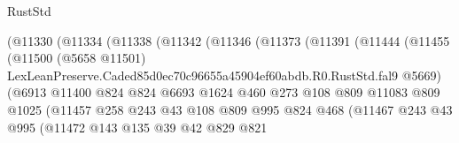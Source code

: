 \begin{lexlean}{RustStd}
\begin{coremodule}
                              (@11330
                                (@11334
                                  (@11338
                                    (@11342
                                      (@11346
                                        (@11373
                                          (@11391
                                            (@11444
                                              (@11455
                                                (@11500
                                                  (@5658 @11501)
                                                  LexLeanPreserve.Caded85d0ec70c96655a45904ef60abdb.R0.RustStd.fal9
                                                  @5669)
                                                (@6913
                                                  @11400
                                                  @824
                                                  @824
                                                  @6693
                                                  @1624
                                                  @460
                                                  @273
                                                  @108
                                                  @809
                                                  @11083
                                                  @809
                                                  @1025
                                                  (@11457
                                                    @258
                                                    @243
                                                    @43
                                                    @108
                                                    @809
                                                    @995
                                                    @824
                                                    @468
                                                    (@11467
                                                      @243
                                                      @43
                                                      @995
                                                      (@11472
                                                        @143
                                                        @135
                                                        @39
                                                        @42
                                                        @829
                                                        @821

\end{coremodule}
\end{lexlean}
